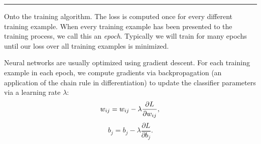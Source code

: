 %
%
%
%
%
%

\hspace{\fill}\rule{0.5\linewidth}{.5pt}\hspace{\fill}

Onto the training algorithm. The loss is computed once for every different training example. When every training example has been presented to the training process, we call this an \emph{epoch}. Typically we will train for many epochs until our loss over all training examples is minimized.

Neural networks are usually optimized using gradient descent. For each training example in each epoch, we compute gradients via backpropagation (an application of the chain rule in differentiation) to update the classifier parameters via a learning rate $\lambda$:
\begin{equation}
w_{ij} = w_{ij} - \lambda\frac{\partial L}{\partial w_{ij}}, \\
\end{equation}
\begin{equation}
b_j = b_j - \lambda\frac{\partial L}{\partial b_j}.
\end{equation}

